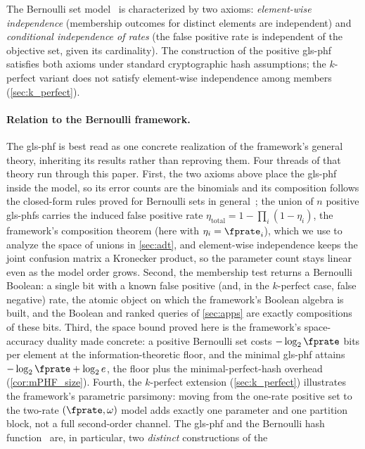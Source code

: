 \documentclass[ ../main.tex]{subfiles}
\begin{document}
The Bernoulli set model~\cite{bsets} is characterized by two axioms:
\emph{element-wise independence} (membership outcomes for distinct elements are
independent) and \emph{conditional independence of rates} (the false positive
rate is independent of the objective set, given its cardinality). The
construction of the positive \gls{gls-phf} satisfies both axioms under
standard cryptographic hash assumptions; the $k$-perfect variant does not
satisfy element-wise independence among members (\cref{sec:k_perfect}).

\paragraph{Relation to the Bernoulli framework.}
The \gls{gls-phf} is best read as one concrete realization of the framework's
general theory, inheriting its results rather than reproving them. Four threads
of that theory run through this paper. First, the two axioms above place the
\gls{gls-phf} inside the model, so its error counts are the binomials and its
composition follows the closed-form rules proved for Bernoulli sets in
general~\cite{bsets}; the union of $n$ positive \glspl{gls-phf} carries the
induced false positive rate $\eta_{\mathrm{total}} = 1 - \prod_{i} (1 - \eta_i)$,
the framework's composition theorem (here with $\eta_i = \fprate_i$), which we
use to analyze the space of unions in \cref{sec:adt}, and element-wise
independence keeps the joint confusion matrix a Kronecker product, so the
parameter count stays linear even as the model order grows. Second, the membership test returns a Bernoulli
Boolean: a single bit with a known false positive (and, in the $k$-perfect case,
false negative) rate, the atomic object on which the framework's Boolean algebra
is built, and the Boolean and ranked queries of \cref{sec:apps} are exactly
compositions of these bits. Third, the space bound proved here is the
framework's space-accuracy duality made concrete: a positive Bernoulli set costs
$-\log_2 \fprate$ bits per element at the information-theoretic floor, and the
minimal \gls{gls-phf} attains $-\log_2 \fprate + \log_2 e$, the floor plus the
minimal-perfect-hash overhead (\cref{cor:mPHF_size}). Fourth, the $k$-perfect
extension (\cref{sec:k_perfect}) illustrates the framework's parametric
parsimony: moving from the one-rate positive set to the two-rate
$(\fprate, \omega)$ model adds exactly one parameter and one partition block, not
a full second-order channel. The \gls{gls-phf} and the Bernoulli hash
function~\cite{shs} are, in particular, two \emph{distinct} constructions of the
\end{document}
